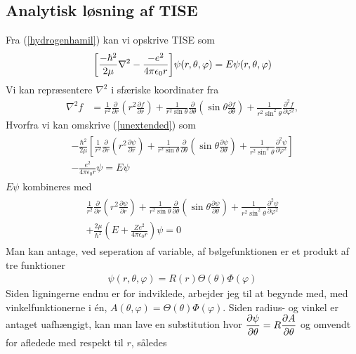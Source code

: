 \documentclass[12pt]{article}
\theoremstyle{definition}
\theoremstyle{remark}
\theoremstyle{definition}
\numberwithin{equation}{section}
\begin{document}
\subsection{Analytisk løsning af TISE}
Fra (\ref{hydrogenhamil}) kan vi opskrive TISE som
\begin{align}
\label{unextended}
    \qty[\frac{-\hbar^2}{2\mu}\nabla^2 - \frac{-e^2}{4\pi \epsilon_0 r}]\psi(r,\theta,\varphi)=E\psi(r,\theta,\varphi)
\end{align}
Vi kan repræsentere $\nabla^2$ i sfæriske koordinater fra
\begin{align}
\nabla^2f &= \frac{1}{r^2} \frac{\partial}{\partial r} \left(r^2 \frac{\partial f}{\partial r} \right) + \frac{1}{r^2 \sin \theta} \frac{\partial}{\partial \theta} \left(\sin \theta \frac{\partial f}{\partial \theta} \right) + \frac{1}{r^2 \sin^2 \theta} \frac{\partial^2 f}{\partial \varphi^2},
\end{align}
Hvorfra vi kan omskrive (\ref{unextended}) som
\begin{align}
    \begin{split}
         -\frac{\hbar^2}{2 \mu} \left[ \frac{1}{r^2} \frac{\partial}{\partial r} \left( r^2 \frac{\partial \psi}{\partial r} \right) + \frac{1}{r^2 \sin \theta} \frac{\partial}{\partial \theta} \left( \sin \theta \frac{\partial \psi}{\partial \theta} \right) + \frac{1}{r^2 \sin^2 \theta} \frac{\partial^2 \psi}{\partial \varphi^2} \right]\\
         - \frac{e^2}{4 \pi \epsilon_0 r} \psi = E \psi
    \end{split}
\end{align}
$E\psi$ kombineres med 
\begin{align}
\begin{split}
    \frac{1}{r^2}\frac{\partial}{\partial r}\left(r^2\frac{\partial\psi}{\partial r}\right)+\frac{1}{r^2\sin\theta}\frac{\partial}{\partial\theta}\left(\sin\theta\frac{\partial\psi}{\partial\theta}\right)+\frac{1}{r^2\sin^2\theta}\frac{\partial^2\psi}{\partial\varphi^2}\\+\frac{2\mu}{\hbar^2}\left(E+\frac{Ze^2}{4\pi\epsilon_0r}\right)\psi=0
\end{split}
\end{align}
Man kan antage, ved seperation af variable, af bølgefunktionen er et produkt af tre funktioner
\begin{align}
\label{opdeling}
    \psi(r, \theta, \varphi) = R(r)\Theta (\theta) \Phi (\varphi)
\end{align}
Siden ligningerne endnu er for indviklede, arbejder jeg til at begynde med, med vinkelfunktionerne i én, $A(\theta, \varphi) = \Theta(\theta)\Phi(\varphi)$. Siden radius- og vinkel er antaget uafhængigt, kan man lave en substitution hvor $\displaystyle \pdv{\psi}{\theta} = R\pdv{A}{\theta}$ og omvendt for afledede med respekt til $r$, således
\end{document}
